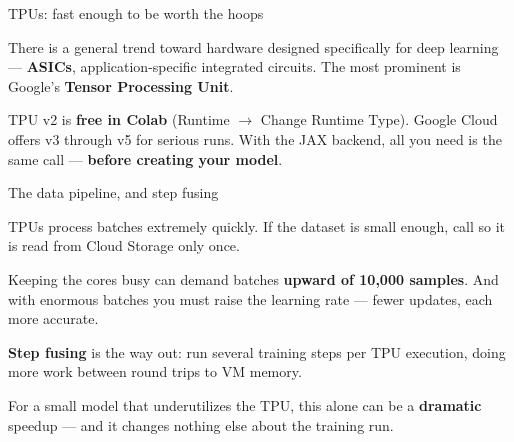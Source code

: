 \documentclass[aspectratio=169,11pt,t]{beamer}
\begin{document}
\begin{frame}[shrink=25]{TPUs: fast enough to be worth the hoops}
{\fontsize{9.4}{12.6}\selectfont\color{fg2}There is a general trend toward hardware designed specifically for deep learning --- \textbf{ASICs}, application-specific integrated circuits. The most prominent is Google's \textbf{Tensor Processing Unit}.\par}\vskip 4pt
\begin{minipage}[t]{0.494\textwidth}
\end{minipage}%
\hfill
\begin{minipage}[t]{0.494\textwidth}
\end{minipage}%
{\fontsize{9.4}{12.6}\selectfont\color{fg2}TPU v2 is \textbf{free in Colab} (Runtime $\rightarrow$ Change Runtime Type). Google Cloud offers v3 through v5 for serious runs. With the JAX backend, all you need is the same  call --- \textbf{before creating your model}.\par}\vskip 4pt
\end{frame}

\begin{frame}[shrink=25]{The data pipeline, and step fusing}
\begin{minipage}[t]{0.494\textwidth}
\begin{icardwarn}
TPUs process batches extremely quickly. If the dataset is small enough, call \textbf{} so it is read from Cloud Storage only once.
\end{icardwarn}
\end{minipage}%
\hfill
\begin{minipage}[t]{0.494\textwidth}
\begin{icardwarn}
Keeping the cores busy can demand batches \textbf{upward of 10,000 samples}. And with enormous batches you must raise the learning rate --- fewer updates, each more accurate.
\end{icardwarn}
\end{minipage}%
{\fontsize{9.4}{12.6}\selectfont\color{fg2}\textbf{Step fusing} is the way out: run several training steps per TPU execution, doing more work between round trips to VM memory.\par}\vskip 4pt
{\fontsize{9.4}{12.6}\selectfont\color{fg2}For a small model that underutilizes the TPU, this alone can be a \textbf{dramatic} speedup --- and it changes nothing else about the training run.\par}\vskip 4pt
\end{frame}
\end{document}

